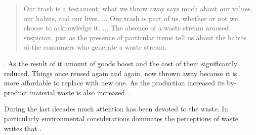 %
%
\begin{quote}
Our trash is a testament; what we throw away says much about our values, our habits, and our lives. ... Our trash is part of us, whether or not we choose to acknowledge it. ... The absence of a waste stream aroused suspicion, just as the presence of particular items tell us about the habits of the consumers who generate a waste stream. \citep{zimring2012encyclopedia}
\end{quote}




 \citep{pye2010trashculture}. As the result of it amount of goods boost and the cost of them significantly reduced. Things once reused again and again, now thrown away because it is more affordable to replace with new one. As the production increased its by-product material waste is also increased.  \citep{pye2010trashculture}.





%
%
During the last decades much attention has been devoted to the waste. In particularly environmental considerations dominates the perceptions of waste. \cite{ibarra2015beautiful} writes that .





